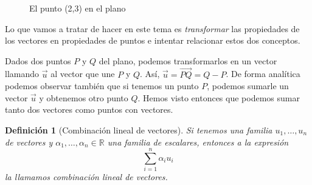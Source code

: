 \documentclass[11pt, a4paper]{article}
\newif\IfInSansMode
\let\oldsf\sffamily
\renewcommand*{\sffamily}{\oldsf\mathversion{sans}\InSansModetrue}
\newcommand{\R}{\mathbb{R}}
\renewcommand{\vec}{\overrightarrow}
\theoremstyle{theorem-style}
\theoremstyle{definition-style}
\newtheorem{ndef}{Definición}[section]
\theoremstyle{remark-style}
\theoremstyle{example-style}
\begin{document}
\begin{figure}[h]
	\sffamily
  \centering
  \caption{El punto (2,3) en el plano}
\end{figure}

Lo que vamos a tratar de hacer en este tema es \textit{transformar} las propiedades de los vectores en propiedades de puntos e intentar relacionar estos dos conceptos.

\begin{minipage}[b]{0.45\textwidth}
  Dados dos puntos $P$ y $Q$ del plano, podemos transformarlos en un vector llamando $\vec{u}$ al vector que une $P$ y $Q$. Así, $\vec{u} = \overrightarrow{PQ} = Q-P$. De forma analítica podemos observar también que si tenemos un punto $P$, podemos sumarle un vector $\vec{u}$ y obtenemos otro punto $Q$. Hemos visto entonces que podemos sumar tanto dos     vectores como puntos con vectores.
\end{minipage} \hfill
\begin{minipage}[b]{0.45\textwidth}
\end{minipage}
\begin{ndef}[Combinación lineal de vectores]
  Si tenemos una familia $u_1,\ldots , u_n$ de vectores y $\alpha_1,\ldots, \alpha_n \in \R$ una familia de escalares, entonces a la expresión
  \[
    \sum_{i=1}^n \alpha_i u_i
  \]
  la llamamos \textit{combinación lineal de vectores}.
\end{ndef}
\end{document}
